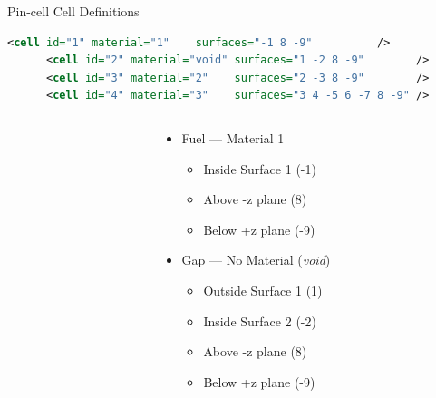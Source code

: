 \documentclass[serif]{beamer}
\begin{document}
\begin{frame}[fragile]{Pin-cell Cell Definitions}

  \begin{scriptsize}
    \begin{lstlisting}[language=XML]
      <cell id="1" material="1"    surfaces="-1 8 -9"          /> 
      <cell id="2" material="void" surfaces="1 -2 8 -9"        />
      <cell id="3" material="2"    surfaces="2 -3 8 -9"        />
      <cell id="4" material="3"    surfaces="3 4 -5 6 -7 8 -9" />
    \end{lstlisting}
  \end{scriptsize}
  \vfill
  \begin{columns}
    \begin{column}{0.3\linewidth}
      \begin{center}
      \end{center}
    \end{column}
    \begin{column}{0.4\linewidth}\footnotesize
	  \begin{itemize}
        \item<1-> {\color{red} Fuel} --- Material 1
        \begin{itemize}\scriptsize
           \item<1-> Inside Surface 1 (-1)
           \item<1-> Above -z plane (8)
           \item<1-> Below +z plane (-9)
        \end{itemize}\vfill
        \item<1-> {\color{green} Gap} --- No Material (\emph{void})
        \begin{itemize}\scriptsize
           \item<1-> Outside Surface 1 (1)
           \item<1-> Inside Surface 2 (-2) 
           \item<1-> Above -z plane (8)
           \item<1-> Below +z plane (-9)
        \end{itemize}
      \end{itemize}

\end{column}
\end{columns}
\end{frame}
\end{document}
